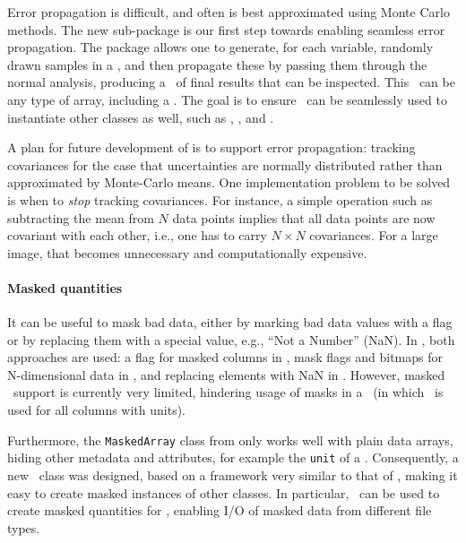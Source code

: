 \documentclass[modern]{aastex631}
\begin{document}
Error propagation is difficult, and often is best approximated using Monte Carlo
methods. The new  sub-package is our first step
towards enabling seamless error propagation. The package allows one to
generate, for each variable, randomly drawn samples in a \astropyDistribution,
and then propagate these by passing them through the normal analysis, producing
a \astropyDistribution\ of final results that can be inspected. This
\astropyDistribution\ can be any type of array, including a \astropyQuantity.
The goal is to ensure \astropyDistribution\ can be seamlessly used to
instantiate other \astropypkg classes as well, such as \astropySkyCoord,
\astropyTime, and \astropyCosmology.

A plan for future development of  is to
support error propagation: tracking covariances for the case that uncertainties
are normally distributed rather than approximated by Monte-Carlo means. One
implementation problem to be solved is when to {\em stop} tracking covariances.
For instance, a simple operation such as subtracting the mean from $N$ data
points implies that all data points are now covariant with each other, i.e., one
has to carry $N\times N$ covariances. For a large image, that becomes unnecessary
and computationally expensive.

\paragraph{Masked quantities}  It can be useful to mask bad data, either by marking
bad data values with a flag or by replacing them with a special
value, e.g., ``Not a Number'' (NaN). In \astropypkg, both approaches are
used: a flag for masked columns in \astropyTable, mask flags and bitmaps
for N-dimensional data in , and replacing elements with
NaN in \astropyTime. However, masked \astropyQuantity\ support is currently very limited,
hindering usage of masks in a \astropyQTable\ (in which \astropyQuantity\ is used
for all columns with units).

Furthermore, the \texttt{MaskedArray} class from  only works
well with plain data arrays, hiding other metadata and attributes, for example
the \texttt{unit} of a \astropyQuantity. Consequently, a new \astropyMasked\
class was designed, based on a framework very similar to that of
\astropyDistribution, making it easy to create masked instances of other
classes. In particular, \astropyMasked\ can be used to create masked quantities
for \astropyQTable, enabling I/O of masked data from different file types.
\end{document}
